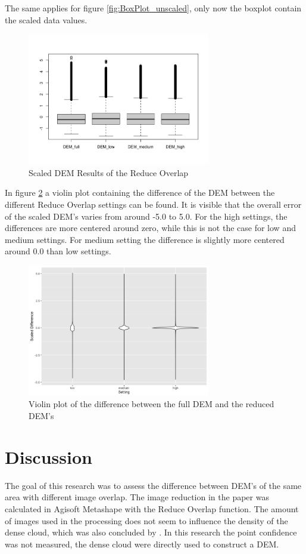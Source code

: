 \documentclass{isprs} %
\begin{document}
The same applies for figure \ref{fig:BoxPlot_unscaled}, only now the boxplot contain the scaled data values.

\begin{figure}[h]
    \centering
    \includegraphics[width=8cm]{DemBoxPlot_Scaled.png}
    \caption{Scaled DEM Results of the Reduce Overlap}
    \label{fig:BoxPlot_scaled}
\end{figure}

In figure \ref{fig:ViolinPlot} a violin plot containing the difference of the DEM between the different Reduce Overlap settings can be found. 
It is visible that the overall error of the scaled DEM's varies from around -5.0 to 5.0.
For the high settings, the differences are more centered around zero, while this is not the case for low and medium settings.
For medium setting the difference is slightly more centered around 0.0 than low settings.

\begin{figure}[h]
    \centering
    \includegraphics[width=8cm]{ViolinPlotOrdered.png}
    \caption{Violin plot of the difference between the full DEM and the reduced DEM's}
    \label{fig:ViolinPlot}
\end{figure}


\section{Discussion}
The goal of this research was to assess the difference between DEM's of the same area with different image overlap. 
The image reduction in the paper was calculated in Agisoft Metashape with the Reduce Overlap function.
The amount of images used in the processing does not seem to influence the density of the dense cloud, which was also concluded by \citet{EffectofUABimgcamover}.
In this research the point confidence was not measured, the dense cloud were directly used to construct a DEM. 
\end{document}
